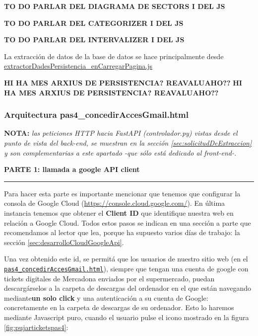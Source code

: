 \documentclass[a4paper,12pt]{report}
\begin{document}
	\textbf{TO DO PARLAR DEL DIAGRAMA DE SECTORS I DEL JS}
	
	\textbf{TO DO PARLAR DEL CATEGORIZER I DEL JS}
	
	\textbf{TO DO PARLAR DEL INTERVALIZER I DEL JS}
	
	
	
	La extracción de datos de la base de datos se hace principalmente desde \href{	https://github.com/blackcub3s/mercApp/blob/main/APP%20WEB/__frontend__produccio__/app/js/dashboard/extractorDadesPersistencia_enCarregarPagina.js}{extractorDadesPersistencia\_enCarregarPagina.js}
	
	\textbf{HI HA MES ARXIUS DE PERSISTENCIA? REAVALUAHO??}
		\textbf{HI HA MES ARXIUS DE PERSISTENCIA? REAVALUAHO??}
	
	\subsubsection{Arquitectura pas4\_concedirAccesGmail.html}
	\label{sec:pas4googleAPIclient}
	
	
	\textbf{NOTA:} \textit{las peticiones HTTP hacia FastAPI (controlador.py) vistas desde el punto de vista del back-end, se muestran en la sección \ref{sec:solicitudDeExtraccion} y son complementarias a este apartado -que sólo está dedicado al front-end-.}
	
	
	
		
	\noindent \textbf{PARTE 1: llamada a google API client}
	\hrule
	\vspace{.5em}
	
	Para hacer esta parte es importante mencionar que tenemos que configurar la consola de Google Cloud (\href{https://console.cloud.google.com/}{https://console.cloud.google.com/}). En última instancia tenemos que obtener el \textbf{Client ID} que identifique nuestra web en relación a Google Cloud. Todos estos pasos se indican en una sección a parte que recomendamos al lector que lea, porque ha supuesto varios días de trabajo: la sección \ref{sec:desarrolloCloudGoogleApi}.
	
	Una vez obtenido este id, se permitá que los usuarios de nuestro sitio web (en el \href{https://github.com/blackcub3s/mercApp/blob/main/APP%20WEB/__frontend__produccio__/app/pas4_concedirAccesGmail.html}{\texttt{pas4\_concedirAccesGmail.html}}), siempre que tengan una cuenta de google con tickets digitales de Mercadona enviados por el supermercado, puedan descargárselos a la carpeta de descargas del ordenador en el que están navegando mediante\textbf{un solo click} y una autenticación a su cuenta de Google: concretamente en la carpeta de descargas de su ordenador. Esto lo haremos mediante Javascript puro, cuando el usuario pulse el icono mostrado en la figura \ref{fig:pujarticketspas4}:
	
\end{document}

